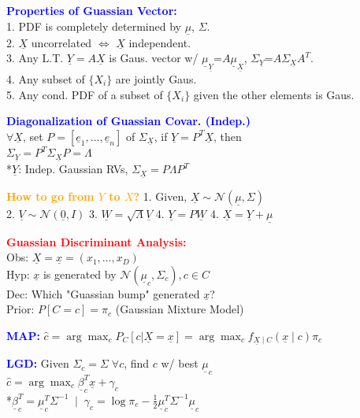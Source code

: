 \documentclass[5pt]{extarticle} %
\begin{document}
\begin{paracol}{3}
{    \textcolor{blue}{\textbf{Properties of Guassian Vector:}} \\
    1. PDF is completely determined by $\underline{\mu}$, $\Sigma$. \\
    2. $\underline{X}$ uncorrelated $\iff$ $\underline{X}$ independent. \\
    3. Any L.T. $\underline{Y} = A \underline{X}$ is Gaus. vector w/ $\underline{\mu}_{\underline{Y}} \text{=} A \underline{\mu}_{\underline{X}}$, $\Sigma_{\underline{Y}} \text{=} A \Sigma_{\underline{X}} A^T$. \\
    4. Any subset of $\{X_i\}$ are jointly Gaus. \\
    5. Any cond. PDF of a subset of $\{X_i\}$ given the other elements is Gaus. 

    \textcolor{blue}{\textbf{Diagonalization of Guassian Covar. (Indep.)}} \\ 
    $\forall \underline{X}$, set $P = [\underline{e}_1, \ldots, \underline{e}_n]$ of $\Sigma_{\underline{X}}$, if $\underline{Y} = P^T \underline{X}$, then \\
    $\Sigma_{\underline{Y}} = P^T \Sigma_{\underline{X}} P = \Lambda$ \\
    *$\underline{Y}$: Indep. Gaussian RVs, $\Sigma_{\underline{X}} = P \Lambda P^T$

    \textcolor{orange}{\textbf{How to go from $Y$ to $X$?}} 1. Given, $\underline{X} \sim \mathcal{N}(\underline{\mu}, \Sigma)$ \\
    2. $\underline{V} \sim \mathcal{N} (\underline{0}, I)$ 3. $\underline{W} = \sqrt{\Lambda} \underline{V}$ 4. $\underline{Y} = P \underline{W}$ 4. $\underline{X} = \underline{Y} + \underline{\mu}$

    \textcolor{red}{\textbf{Guassian Discriminant Analysis:}} \\
    Obs: $\underline{X} = \underline{x} = (x_1,\ldots,x_D)$ \\
    Hyp: $\underline{x}$ is generated by $\mathcal{N} (\underline{\mu}_c, \Sigma_c), c \in C$ \\
    Dec: Which "Guassian bump" generated $\underline{x}$? \\
    Prior: $P[C = c] = \pi_c$  (Gaussian Mixture Model) 

    \textcolor{blue}{\textbf{MAP:}} $\hat{c} = \arg \max_c P_C[c | \underline{X} = \underline{x}] = \arg \max_c f_{\underline{X} \mid C} (\underline{x} \mid c) \pi_c$ 

    \textcolor{blue}{\textbf{LGD:}} Given $\Sigma_c = \Sigma \; \forall c$, find $c$ w/ best $\underline{\mu}_c$ \\
    $\hat{c} = \arg \max_c \underline{\beta}_c^T \underline{x} + \gamma_c$ \\
    *$\underline{\beta}_c^T = \underline{\mu}_c^T \Sigma^{-1} \; \mid \; \gamma_c = \log \pi_c - \frac{1}{2} \underline{\mu}_c^T \Sigma^{-1} \underline{\mu}_c$ \\

}
\end{paracol}
\end{document}
